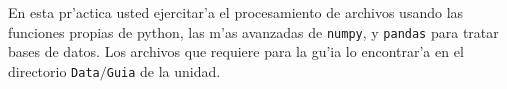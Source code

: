 \documentclass[11pt]{exam}
\begin{document}
\firstpageheadrule
\runningheadrule
{}
\cfoot{ }
\begin{flushleft}
\vspace{0.2in}
\vspace{0.25cm}
\end{flushleft}

En esta pr'actica usted ejercitar'a el procesamiento de archivos usando las funciones propias de python, las m'as avanzadas de \texttt{numpy}, y \texttt{pandas} para tratar bases de datos. Los archivos que requiere para la gu'ia lo encontrar'a en el directorio \texttt{Data$/$Guia} de la unidad.
\end{document}
